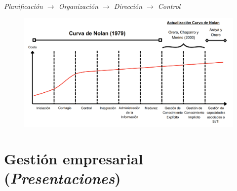 \documentclass{templateNote}
\begin{document}
\begin{center}
    \textit{Planificación $\rightarrow$ Organización $\rightarrow$ Dirección $\rightarrow$ Control}
    \begin{figure}[H]
        \centering
        \vspace*{\fill}
        \includegraphics[width=1\textwidth,height=0.30\textheight,keepaspectratio]{img/CurvaDeNolanActualizada.png}
        \vspace*{\fill}
    \end{figure}
\end{center}
% 

\section{Gestión empresarial (\textit{Presentaciones})}
\end{document}
